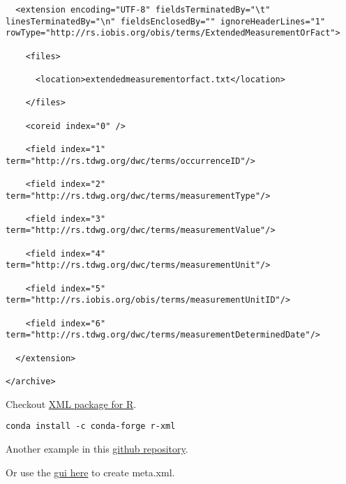 \documentclass[
]{book}
\begin{document}
\begin{verbatim}
  <extension encoding="UTF-8" fieldsTerminatedBy="\t" linesTerminatedBy="\n" fieldsEnclosedBy="" ignoreHeaderLines="1" rowType="http://rs.iobis.org/obis/terms/ExtendedMeasurementOrFact">

    <files>

      <location>extendedmeasurementorfact.txt</location>

    </files>

    <coreid index="0" />

    <field index="1" term="http://rs.tdwg.org/dwc/terms/occurrenceID"/>

    <field index="2" term="http://rs.tdwg.org/dwc/terms/measurementType"/>

    <field index="3" term="http://rs.tdwg.org/dwc/terms/measurementValue"/>

    <field index="4" term="http://rs.tdwg.org/dwc/terms/measurementUnit"/>

    <field index="5" term="http://rs.iobis.org/obis/terms/measurementUnitID"/>

    <field index="6" term="http://rs.tdwg.org/dwc/terms/measurementDeterminedDate"/>

  </extension>

</archive>
\end{verbatim}

Checkout \href{https://cran.r-project.org/web/packages/XML/index.html}{XML package for R}.

\texttt{conda\ install\ -c\ conda-forge\ r-xml}

Another example in this \href{https://github.com/EDIorg/ecocomDP/blob/372c293c9e597c64db22c027debe18528d44f53b/inst/extdata/dwca_event_core/meta.xml}{github repository}.

Or use the \href{http://tools.gbif.org/dwca-assistant/}{gui here} to create meta.xml.
\end{document}
